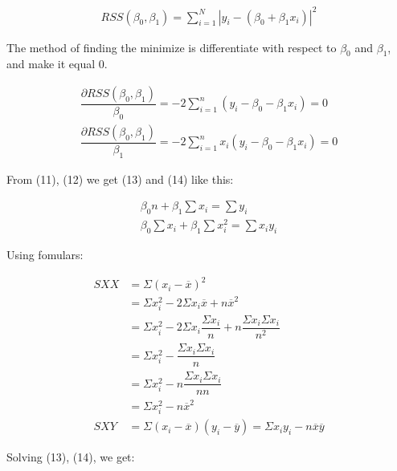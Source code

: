 \documentclass{article}
\begin{document}
    \begin{align}
        RSS(\beta_{0}, \beta_{1}) = \displaystyle \sum _{i = 1} ^ {N}   |y_{i} - (\beta_{0} + \beta_{1} x_{i})| ^ 2
    \end{align}
    
    The method of finding the minimize is differentiate with respect to $\beta_{0}$ and $\beta_{1}$, and make it equal $0$. 
    
    \begin{align} 
        \dfrac{\partial RSS(\beta_{0}, \beta_{1}) }{\beta_{0}} = -2 \displaystyle \sum _{i=1}^{n}  (y_{i} - \beta_{0} - \beta_{1} x_{i}) = 0
        \\
        \dfrac{\partial RSS(\beta_{0}, \beta_{1}) }{\beta_{1}} = -2 \displaystyle \sum _{i=1}^{n}  x_{i} (y_{i} - \beta_{0} - \beta_{1} x_{i}) = 0
    \end{align}
        
    From (11), (12) we get (13) and (14) like this: 
    
    \begin{align} 
        \beta_{0} n + \beta_{1} \displaystyle \sum x_{i} = \displaystyle \sum y_{i}
        \\
        \beta_{0} \displaystyle \sum x_{i} + \beta_{1} \displaystyle \sum x_{i}^2 = \displaystyle \sum x_{i} y_{i}
    \end{align}
    
    Using fomulars: 
    
     \begin{align} 
        SXX &= \Sigma (x_{i} - \overline{x})^2 \\
        &= \Sigma x_{i}^2 - 2 \Sigma x_{i} \overline{x} + n\overline{x}^2  \nonumber \\
        &= \Sigma x_{i}^2 - 2 \Sigma x_{i} \dfrac{\Sigma x_{i}}{n} + n\dfrac{\Sigma x_{i} \Sigma x_{i}}{n^2}   \nonumber \\
        &= \Sigma x_{i}^2 - \dfrac{\Sigma x_{i} \Sigma x_{i}}{n} \nonumber \\
        &= \Sigma x_{i}^2 - n\dfrac{\Sigma x_{i} \Sigma x_{i}}{n n} \nonumber \\
        &= \Sigma x_{i}^2 - n\overline{x}^2 \nonumber \\
        SXY &= \Sigma (x_{i} - \overline{x})(y_{i} - \overline{y}) = \Sigma x_{i}y_{i} - n\overline{x}\overline{y}
    \end{align}
    
    Solving (13), (14), we get:
    
\end{document}

